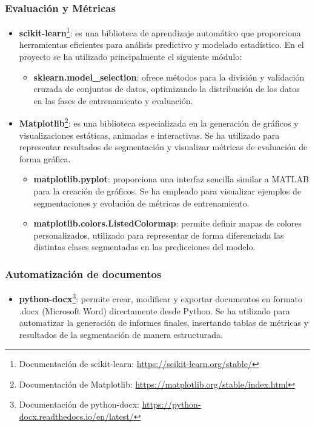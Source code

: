 \subsubsection{Evaluación y Métricas}
\begin{itemize}
    \item \textbf{scikit-learn}\footnote{Documentación de scikit-learn: \url{https://scikit-learn.org/stable/}}: es una biblioteca de aprendizaje automático que proporciona herramientas eficientes para análisis predictivo y modelado estadístico. En el proyecto se ha utilizado principalmente el siguiente módulo:
    \begin{itemize}
    \item \textbf{sklearn.model\_selection}: ofrece métodos para la división y validación cruzada de conjuntos de datos, optimizando la distribución de los datos en las fases de entrenamiento y evaluación.
    \end{itemize}
    \item \textbf{Matplotlib}\footnote{Documentación de Matplotlib: \url{https://matplotlib.org/stable/index.html}}: es una biblioteca especializada en la generación de gráficos y visualizaciones estáticas, animadas e interactivas. Se ha utilizado para representar resultados de segmentación y visualizar métricas de evaluación de forma gráfica.
    \begin{itemize}
    \item \textbf{matplotlib.pyplot}: proporciona una interfaz sencilla similar a MATLAB para la creación de gráficos. Se ha empleado para visualizar ejemplos de segmentaciones y evolución de métricas de entrenamiento.
    \item \textbf{matplotlib.colors.ListedColormap}: permite definir mapas de colores personalizados, utilizado para representar de forma diferenciada las distintas clases segmentadas en las predicciones del modelo.
    \end{itemize}
\end{itemize}

\subsubsection{Automatización de documentos}
\begin{itemize}
    \item \textbf{python-docx}\footnote{Documentación de python-docx: \url{https://python-docx.readthedocs.io/en/latest/}}: permite crear, modificar y exportar documentos en formato .docx (Microsoft Word) directamente desde Python. Se ha utilizado para automatizar la generación de informes finales, insertando tablas de métricas y resultados de la segmentación de manera estructurada.
\end{itemize}
